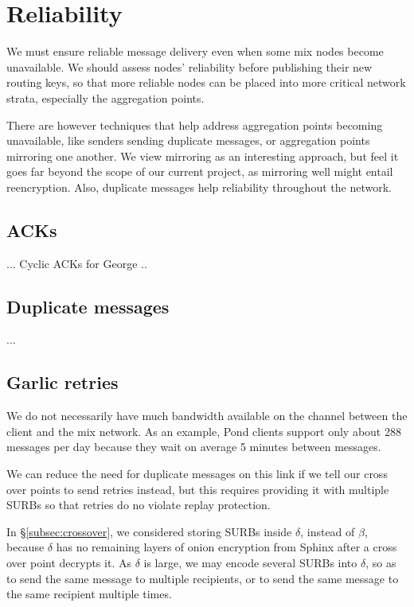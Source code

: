 
\section{Reliability}

We must ensure reliable message delivery even when some mix nodes
become unavailable.  We should assess nodes' reliability before
publishing their new routing keys, so that more reliable nodes can
be placed into more critical network strata, especially the
aggregation points.

There are however techniques that help address aggregation points
becoming unavailable, like senders sending duplicate messages,
 or aggregation points mirroring one another.
We view mirroring as an interesting approach, but feel it goes far
beyond the scope of our current project, as mirroring well might
entail reencryption.  Also, duplicate messages help reliability
throughout the network.


\subsection{ACKs}

... Cyclic ACKs for George ..


\subsection{Duplicate messages}

...


\subsection{Garlic retries}\label{subsec:garlic_retries}

We do not necessarily have much bandwidth available on the channel
between the client and the mix network.  As an example, Pond clients
support only about 288 messages per day because they wait on average
5 minutes between messages.

We can reduce the need for duplicate messages on this link if
we tell our cross over points to send retries instead, but this
requires providing it with multiple SURBs so that retries do no
violate replay protection.

In \S\ref{subsec:crossover}, we considered storing SURBs inside
$\delta$, instead of $\beta$, because $\delta$ has no remaining layers
of onion encryption from Sphinx after a cross over point decrypts it. 
As $\delta$ is large, we may encode several SURBs into $\delta$,
so as to send the same message to multiple recipients, or to send
the same message to the same recipient multiple times.  

